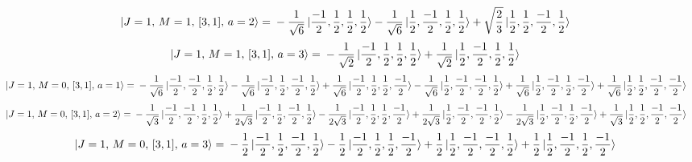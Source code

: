 \documentclass{article}
\begin{document}
\begin{equation*}
\begin{aligned}
\ket{J=1,\,M=1,\,[3,1],\,a=2} = \; &- \frac{1}{\sqrt{6}} \ket{\frac{-1}{2},\frac{1}{2},\frac{1}{2},\frac{1}{2}} - \frac{1}{\sqrt{6}} \ket{\frac{1}{2},\frac{-1}{2},\frac{1}{2},\frac{1}{2}} + \sqrt{\frac{2}{3}} \ket{\frac{1}{2},\frac{1}{2},\frac{-1}{2},\frac{1}{2}}
\end{aligned}
\end{equation*}
\begin{equation*}
\begin{aligned}
\ket{J=1,\,M=1,\,[3,1],\,a=3} = \; &- \frac{1}{\sqrt{2}} \ket{\frac{-1}{2},\frac{1}{2},\frac{1}{2},\frac{1}{2}} + \frac{1}{\sqrt{2}} \ket{\frac{1}{2},\frac{-1}{2},\frac{1}{2},\frac{1}{2}}
\end{aligned}
\end{equation*}
\begin{equation*}
\begin{aligned}
\ket{J=1,\,M=0,\,[3,1],\,a=1} = \; &- \frac{1}{\sqrt{6}} \ket{\frac{-1}{2},\frac{-1}{2},\frac{1}{2},\frac{1}{2}} - \frac{1}{\sqrt{6}} \ket{\frac{-1}{2},\frac{1}{2},\frac{-1}{2},\frac{1}{2}} + \frac{1}{\sqrt{6}} \ket{\frac{-1}{2},\frac{1}{2},\frac{1}{2},\frac{-1}{2}} - \frac{1}{\sqrt{6}} \ket{\frac{1}{2},\frac{-1}{2},\frac{-1}{2},\frac{1}{2}} + \frac{1}{\sqrt{6}} \ket{\frac{1}{2},\frac{-1}{2},\frac{1}{2},\frac{-1}{2}} + \frac{1}{\sqrt{6}} \ket{\frac{1}{2},\frac{1}{2},\frac{-1}{2},\frac{-1}{2}}
\end{aligned}
\end{equation*}
\begin{equation*}
\begin{aligned}
\ket{J=1,\,M=0,\,[3,1],\,a=2} = \; &- \frac{1}{\sqrt{3}} \ket{\frac{-1}{2},\frac{-1}{2},\frac{1}{2},\frac{1}{2}} + \frac{1}{2\sqrt{3}} \ket{\frac{-1}{2},\frac{1}{2},\frac{-1}{2},\frac{1}{2}} - \frac{1}{2\sqrt{3}} \ket{\frac{-1}{2},\frac{1}{2},\frac{1}{2},\frac{-1}{2}} + \frac{1}{2\sqrt{3}} \ket{\frac{1}{2},\frac{-1}{2},\frac{-1}{2},\frac{1}{2}} - \frac{1}{2\sqrt{3}} \ket{\frac{1}{2},\frac{-1}{2},\frac{1}{2},\frac{-1}{2}} + \frac{1}{\sqrt{3}} \ket{\frac{1}{2},\frac{1}{2},\frac{-1}{2},\frac{-1}{2}}
\end{aligned}
\end{equation*}
\begin{equation*}
\begin{aligned}
\ket{J=1,\,M=0,\,[3,1],\,a=3} = \; &- \frac{1}{2} \ket{\frac{-1}{2},\frac{1}{2},\frac{-1}{2},\frac{1}{2}} - \frac{1}{2} \ket{\frac{-1}{2},\frac{1}{2},\frac{1}{2},\frac{-1}{2}} + \frac{1}{2} \ket{\frac{1}{2},\frac{-1}{2},\frac{-1}{2},\frac{1}{2}} + \frac{1}{2} \ket{\frac{1}{2},\frac{-1}{2},\frac{1}{2},\frac{-1}{2}}
\end{aligned}
\end{equation*}
\end{document}
